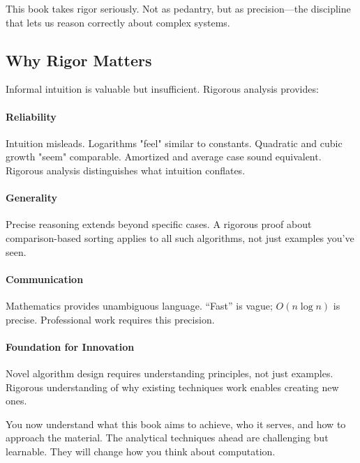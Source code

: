 This book takes rigor seriously. Not as pedantry, but as precision—the discipline that lets us reason correctly about complex systems.

\subsection{Why Rigor Matters}

Informal intuition is valuable but insufficient. Rigorous analysis provides:

\paragraph{Reliability}
Intuition misleads. Logarithms "feel" similar to constants. Quadratic and cubic growth "seem" comparable. Amortized and average case sound equivalent. Rigorous analysis distinguishes what intuition conflates.

\paragraph{Generality}
Precise reasoning extends beyond specific cases. A rigorous proof about comparison-based sorting applies to all such algorithms, not just examples you've seen.

\paragraph{Communication}
Mathematics provides unambiguous language. ``Fast'' is vague; $O(n \log n)$ is precise. Professional work requires this precision.

\paragraph{Foundation for Innovation}
Novel algorithm design requires understanding principles, not just examples. Rigorous understanding of why existing techniques work enables creating new ones.


You now understand what this book aims to achieve, who it serves, and how to approach the material. The analytical techniques ahead are challenging but learnable. They will change how you think about computation.
